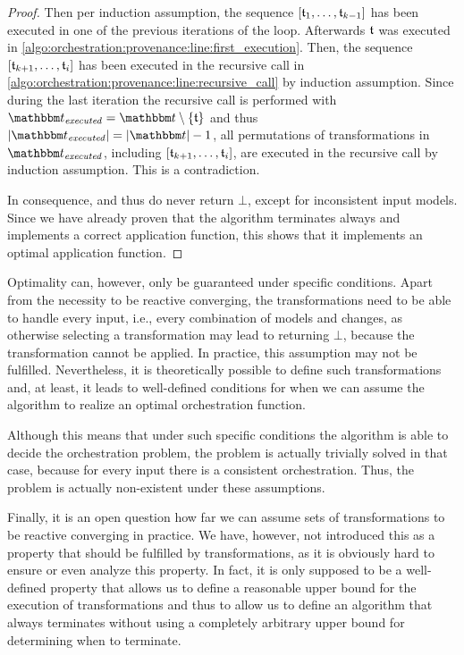 \begin{proof}
    Then per induction assumption, the sequence $\sequenced{\transformation{t}_{1}, \dots, \transformation{t}_{k-1}}$ has been executed in one of the previous iterations of the loop.
    Afterwards $\transformation{t}$ was executed in \autoref{algo:orchestration:provenance:line:first_execution}.
    Then, the sequence $\sequenced{\transformation{t}_{k+1}, \dots, \transformation{t}_{i}}$ has been executed in the recursive call in \autoref{algo:orchestration:provenance:line:recursive_call} by induction assumption.
    Since during the last iteration the recursive call is performed with $\provalgexecuted = \transformationset{t} \setminus \setted{\transformation{t}}$ and thus $\abs{\provalgexecuted} = \abs{\transformationset{t}} - 1$, all permutations of transformations in $\provalgexecuted$, including $\sequenced{\transformation{t}_{k+1}, \dots, \transformation{t}_{i}}$, are executed in the recursive call by induction assumption.
    This is a contradiction.

    In consequence,  and thus  do never return $\bot$, except for inconsistent input models. Since we have already proven that the algorithm terminates always and implements a correct application function, this shows that it implements an optimal application function.
\end{proof}

Optimality can, however, only be guaranteed under specific conditions.
Apart from the necessity to be reactive converging, the transformations need to be able to handle every input, i.e., every combination of models and changes, as otherwise selecting a transformation may lead to  returning $\bot$, because the transformation cannot be applied.
In practice, this assumption may not be fulfilled.
Nevertheless, it is theoretically possible to define such transformations and, at least, it leads to well-defined conditions for when we can assume the algorithm to realize an optimal orchestration function.

Although this means that under such specific conditions the algorithm is able to decide the orchestration problem, the problem is actually trivially solved in that case, because for every input there is a consistent orchestration.
Thus, the problem is actually non-existent under these assumptions.

Finally, it is an open question how far we can assume sets of transformations to be reactive converging in practice.
We have, however, not introduced this as a property that should be fulfilled by transformations, as it is obviously hard to ensure or even analyze this property.
In fact, it is only supposed to be a well-defined property that allows us to define a reasonable upper bound for the execution of transformations and thus to allow us to define an algorithm that always terminates without using a completely arbitrary upper bound for determining when to terminate.


